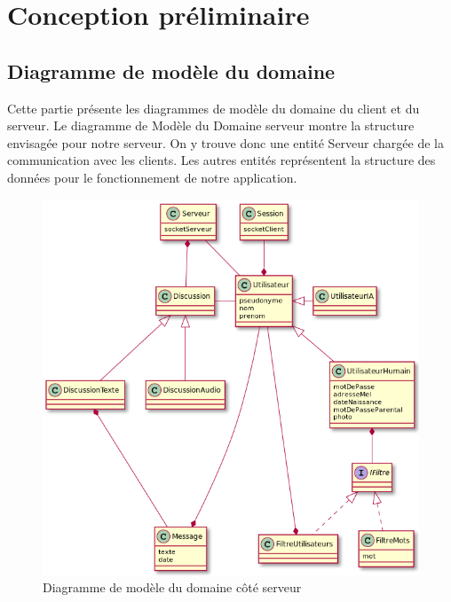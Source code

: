\section{Conception préliminaire}

	\subsection{Diagramme de modèle du domaine}
	Cette partie présente les diagrammes de modèle du domaine du client et du serveur.
	Le diagramme de Modèle du Domaine serveur montre la structure envisagée pour notre serveur.
	On y trouve donc une entité Serveur chargée de la communication avec les clients.
	Les autres entités représentent la structure des données pour le fonctionnement de notre application.

	\begin{figure}[H]
		\centerline{\includegraphics[width=16.5cm]{img/modeleDomaineServeur.png}}
		\caption{Diagramme de modèle du domaine côté serveur}
	\end{figure}

	\newpage

